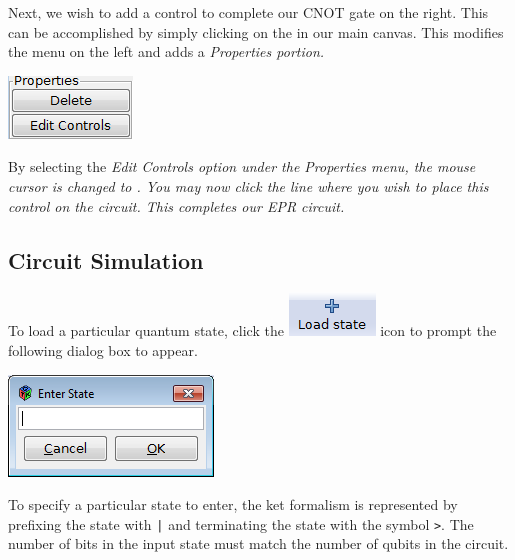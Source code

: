 \documentclass[10pt]{article}
\theoremstyle{definition}
\begin{document}
Next, we wish to add a control to complete our CNOT gate on the right. This can be accomplished by simply clicking on the  in our main canvas. This modifies the menu on the left and adds a \em Properties \em portion. 

\begin{center}
\includegraphics{Figures/CreateCircuit/Properties.png}
\end{center}

By selecting the \em Edit Controls \em option under the \em Properties \em menu, the mouse cursor is changed to . You may now click the line where you wish to place this control on the circuit. This completes our EPR circuit. 

\subsection{Circuit Simulation}\label{sub:CircuitSimulation}
To load a particular quantum state, click the \includegraphics[scale=0.60]{Figures/Navigation/LoadState.png} icon to prompt the following dialog box to appear.

\begin{center}
\includegraphics{Figures/CreateCircuit/LoadState.png}
\end{center}

To specify a particular state to enter, the ket formalism is represented by prefixing the 
state with \verb+|+  and terminating the state with the symbol \verb+>+. The number of
bits in the input state must match the number of qubits in the circuit.
\end{document}
